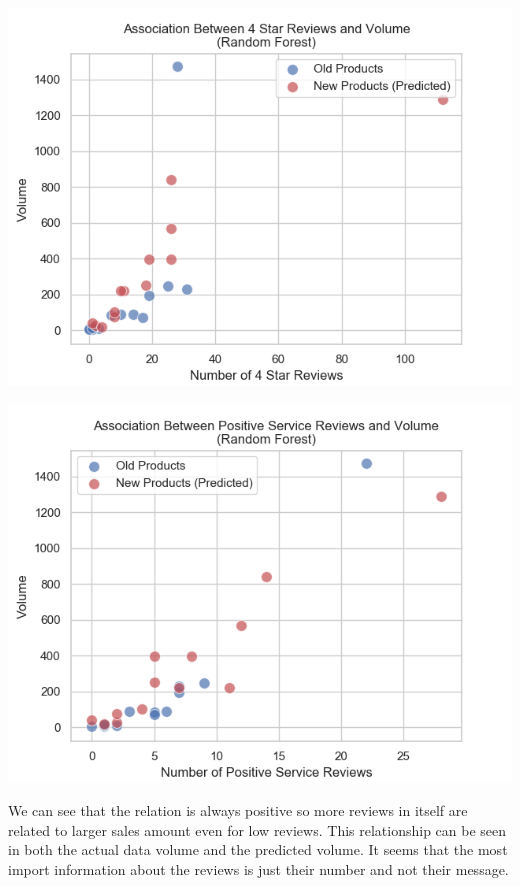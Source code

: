 \documentclass[12pt,a4paper,leqno]{report}
\theoremstyle{plain}
\theoremstyle{definition}
\theoremstyle{remark}
\begin{document}
\bigskip
{
    \centering
    \includegraphics[width=\textwidth,height=\textheight,keepaspectratio]{volume_x4StarReviews_relation.png}
    \par
}
\bigskip

\bigskip
{
    \centering
    \includegraphics[width=\textwidth,height=\textheight,keepaspectratio]{volume_PositiveServiceReview_relation.png}
    \par
}
\bigskip

We can see that the relation is always positive so more reviews in itself
are related to larger sales amount even for low reviews. This relationship can be seen in both
the actual data volume and the predicted volume. It seems that the most
import information about the reviews is just their number and not their
message.
\end{document}
